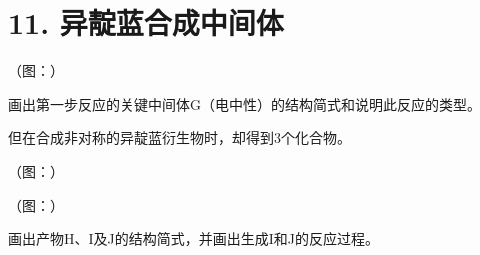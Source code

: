 \section*{11. 异靛蓝合成中间体}
（图：）

画出第⼀步反应的关键中间体G（电中性）的结构简式和说明此反应的类型。

但在合成⾮对称的异靛蓝衍⽣物时，却得到3个化合物。

（图：）

（图：）

画出产物H、I及J的结构简式，并画出⽣成I和J的反应过程。

